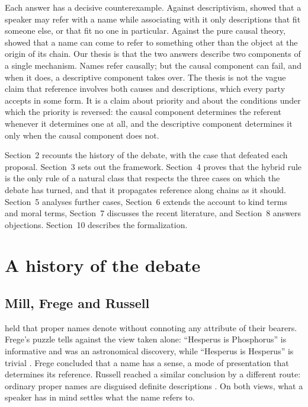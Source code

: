 \documentclass{situationist-preprint}
\begin{document}
Each answer has a decisive counterexample. Against descriptivism, \citet{Kripke1980} showed that a speaker may refer with a name while associating with it only descriptions that fit someone else, or that fit no one in particular. Against the pure causal theory, \citet{Evans1973} showed that a name can come to refer to something other than the object at the origin of its chain. Our thesis is that the two answers describe two components of a single mechanism. Names refer causally; but the causal component can fail, and when it does, a descriptive component takes over. The thesis is not the vague claim that reference involves both causes and descriptions, which every party accepts in some form. It is a claim about priority and about the conditions under which the priority is reversed: the causal component determines the referent whenever it determines one at all, and the descriptive component determines it only when the causal component does not.

Section~2 recounts the history of the debate, with the case that defeated each proposal. Section~3 sets out the framework. Section~4 proves that the hybrid rule is the only rule of a natural class that respects the three cases on which the debate has turned, and that it propagates reference along chains as it should. Section~5 analyses further cases, Section~6 extends the account to kind terms and moral terms, Section~7 discusses the recent literature, and Section~8 answers objections. Section~10 describes the formalization.

\section{A history of the debate}

\subsection{Mill, Frege and Russell}

\citet[I.ii.5]{Mill1843} held that proper names denote without connoting any attribute of their bearers. Frege's puzzle tells against the view taken alone: \enquote{Hesperus is Phosphorus} is informative and was an astronomical discovery, while \enquote{Hesperus is Hesperus} is trivial \citep{Frege1892}. Frege concluded that a name has a sense, a mode of presentation that determines its reference. Russell reached a similar conclusion by a different route: ordinary proper names are disguised definite descriptions \citep{Russell1905}. On both views, what a speaker has in mind settles what the name refers to.
\end{document}
